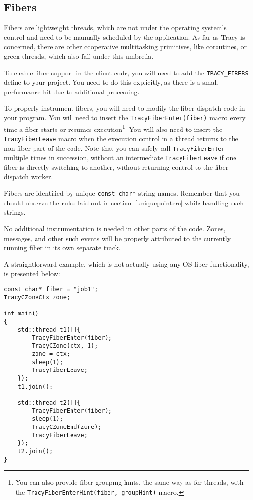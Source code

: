 \documentclass[hidelinks,titlepage,a4paper,twoside]{article}
\begin{document}
\subsection{Fibers}
\label{fibers}

Fibers are lightweight threads, which are not under the operating system's control and need to be manually scheduled by the application. As far as Tracy is concerned, there are other cooperative multitasking primitives, like coroutines, or green threads, which also fall under this umbrella.

To enable fiber support in the client code, you will need to add the \texttt{TRACY\_FIBERS} define to your project. You need to do this explicitly, as there is a small performance hit due to additional processing.

To properly instrument fibers, you will need to modify the fiber dispatch code in your program. You will need to insert the \texttt{TracyFiberEnter(fiber)} macro every time a fiber starts or resumes execution\footnote{You can also provide fiber grouping hints, the same way as for threads, with the \texttt{TracyFiberEnterHint(fiber, groupHint)} macro.}. You will also need to insert the \texttt{TracyFiberLeave} macro when the execution control in a thread returns to the non-fiber part of the code. Note that you can safely call \texttt{TracyFiberEnter} multiple times in succession, without an intermediate \texttt{TracyFiberLeave} if one fiber is directly switching to another, without returning control to the fiber dispatch worker.

Fibers are identified by unique \texttt{const char*} string names. Remember that you should observe the rules laid out in section~\ref{uniquepointers} while handling such strings.

No additional instrumentation is needed in other parts of the code. Zones, messages, and other such events will be properly attributed to the currently running fiber in its own separate track.

A straightforward example, which is not actually using any OS fiber functionality, is presented below:

\begin{lstlisting}
const char* fiber = "job1";
TracyCZoneCtx zone;

int main()
{
    std::thread t1([]{
        TracyFiberEnter(fiber);
        TracyCZone(ctx, 1);
        zone = ctx;
        sleep(1);
        TracyFiberLeave;
    });
    t1.join();

    std::thread t2([]{
        TracyFiberEnter(fiber);
        sleep(1);
        TracyCZoneEnd(zone);
        TracyFiberLeave;
    });
    t2.join();
}
\end{lstlisting}
\end{document}
